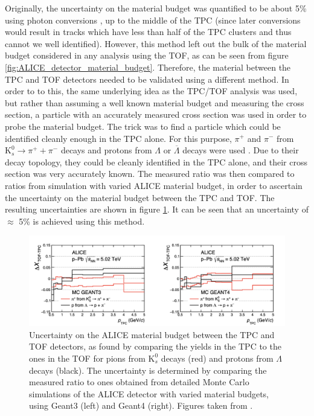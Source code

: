 Originally, the uncertainty on the material budget was quantified to be about 5\% using photon conversions \cite{photon_conversion}, up to the middle of the TPC (since later conversions would result in tracks which have less than half of the TPC clusters and thus cannot we well identified). However, this method left out the bulk of the material budget considered in any analysis using the TOF, as can be seen from figure \ref{fig:ALICE_detector_material_budget}. Therefore, the material between the TPC and TOF detectors needed to be validated using a different method. In order to to this, the same underlying idea as the TPC/TOF analysis was used, but rather than assuming a well known material budget and measuring the cross section, a particle with an accurately measured cross section was used in order to probe the material budget. The trick was to find a particle which could be identified cleanly enough in the TPC alone. For this purpose, $\pi^+$ and $\pi^-$ from $\mathrm{K}_s^0 \rightarrow \pi^+ + \pi^-$ decays and protons from $\Lambda$ or $\overline{\Lambda}$ decays were used \cite{ALICE-PUBLIC-2022-002}. Due to their decay topology, they could be cleanly identified in the TPC alone, and their cross section was very accurately known. The measured ratio was then compared to ratios from simulation with varied ALICE material budget, in order to ascertain the uncertainty on the material budget between the TPC and TOF. The resulting uncertainties are shown in figure \ref{fig:ALICE_mat_budget}. It can be seen that an uncertainty of $\approx$ 5\% is achieved using this method. \\

\begin{figure}
    \centering
    \includegraphics[width=\textwidth]{figures/ALICE_material_budget_tests.png}
    \caption{Uncertainty on the ALICE material budget between the TPC and TOF detectors, as found by comparing the yields in the TPC to the ones in the TOF for pions from $\mathrm{K}_s^0$ decays (red) and protons from $\Lambda$ decays (black). The uncertainty is determined by comparing the measured ratio to ones obtained from detailed Monte Carlo simulations of the ALICE detector with varied material budgets, using Geant3 (left) and Geant4 (right). Figures taken from \cite{ALICE-PUBLIC-2022-001}.}
    \label{fig:ALICE_mat_budget}
\end{figure}

